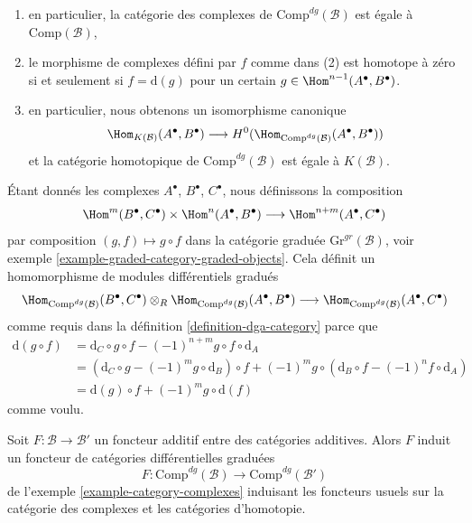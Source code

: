 \begin{example}
\begin{enumerate}
a $\text{d}(f) = 0$ si et seulement si le morphisme
$f : A^\bullet \to B^\bullet[n]$ d'objets gradués de $\mathcal{B}$ est en
fait un morphisme de complexes,
\item en particulier, la catégorie des complexes
de $\text{Comp}^{dg}(\mathcal{B})$ est égale à $\text{Comp}(\mathcal{B})$,
\item le morphisme de complexes défini par $f$ comme dans
(2) est homotope à zéro si et seulement si $f = \text{d}(g)$ pour
un certain $g \in \Hom^{n - 1}(A^\bullet, B^\bullet)$.
\item en particulier, nous obtenons un isomorphisme canonique
$$
\Hom_{K(\mathcal{B})}(A^\bullet, B^\bullet)
\longrightarrow
H^0(\Hom_{\text{Comp}^{dg}(\mathcal{B})}(A^\bullet, B^\bullet))
$$
et la catégorie homotopique de $\text{Comp}^{dg}(\mathcal{B})$ est égale à
$K(\mathcal{B})$.
\end{enumerate}
Étant donnés les complexes $A^\bullet$, $B^\bullet$, $C^\bullet$, nous définissons
la composition
$$
\Hom^m(B^\bullet, C^\bullet) \times \Hom^n(A^\bullet, B^\bullet)
\longrightarrow
\Hom^{n + m}(A^\bullet, C^\bullet)
$$
par composition $(g, f) \mapsto g \circ f$ dans la catégorie graduée
$\text{Gr}^{gr}(\mathcal{B})$, voir
exemple \ref{example-graded-category-graded-objects}. Cela
définit un homomorphisme de modules différentiels gradués
$$
\Hom_{\text{Comp}^{dg}(\mathcal{B})}(B^\bullet, C^\bullet)
\otimes_R
\Hom_{\text{Comp}^{dg}(\mathcal{B})}(A^\bullet, B^\bullet)
\longrightarrow
\Hom_{\text{Comp}^{dg}(\mathcal{B})}(A^\bullet, C^\bullet)
$$
comme requis dans la définition \ref{definition-dga-category}
parce que
\begin{align*}
\text{d}(g \circ f) & =
\text{d}_C \circ g \circ f - (-1)^{n + m} g \circ f \circ \text{d}_A \\
& =
\left(\text{d}_C \circ g - (-1)^m g \circ \text{d}_B\right) \circ f +
(-1)^m g \circ \left(\text{d}_B \circ f - (-1)^n f \circ \text{d}_A\right) \\ & =
\text{d}(g)
\circ f + (-1)^m g \circ \text{d}(f)
\end{align*}
comme voulu.
\end{example}

\begin{lemma}
\label{lemma-additive-functor-induces-dga-functor}
Soit $F : \mathcal{B} \to \mathcal{B}'$ un foncteur additif entre des
catégories additives. Alors $F$ induit un foncteur de catégories
différentielles graduées
$$
F : \text{Comp}^{dg}(\mathcal{B}) \to \text{Comp}^{dg}(\mathcal{B}')
$$
de l'exemple \ref{example-category-complexes}
induisant les foncteurs usuels sur la catégorie des complexes et les
catégories d'homotopie.
\end{lemma}

